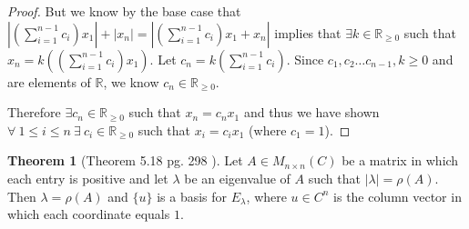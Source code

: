 \documentclass{amsart}
\theoremstyle{definition}
\newtheorem{theorem}{Theorem}
\theoremstyle{remark}
\numberwithin{equation}{section}
\begin{document}
\begin{proof}
But we know by the base case that 
$|(\sum_{i = 1}^{n-1}c_i )x_1| + |x_n| = |(\sum_{i = 1}^{n-1} c_i)x_1 + x_n|$
implies that $\exists k \in \mathbb{R}_{\geq 0}$ such that $x_n = k((\sum_{i = 1}^{n-1} c_i)x_1)$.
Let $c_n = k(\sum_{i = 1}^{n-1} c_i)$.
Since $c_1, c_2 \ldots c_{n-1}, k \geq 0$ and are elements of $\mathbb{R}$, we know $c_n \in \mathbb{R}_{\geq 0}$.

Therefore $\exists c_n \in \mathbb{R}_{\geq 0}$ such that $x_n = c_n x_1$ and thus we have shown $\forall\ 1 \leq i \leq n\ \exists\ c_i \in \mathbb{R}_{\geq 0}$ such that $x_i = c_ix_1$ (where $c_1 = 1$).


\end{proof}

\newpage 

\begin{theorem}[Theorem 5.18 pg. 298 \cite{friedberg2003linear}]\label{theorem518}
Let $A \in M_{n \times n} (C)$ be a matrix in which each entry is positive and let $\lambda$ be an eigenvalue of $A$ such that $| \lambda | = \rho(A)$.
Then $\lambda = \rho(A)$ and $\{ u \}$ is a basis for $E_{\lambda}$, where $u \in C^n$ is the column vector in which each coordinate equals $1$.

\end{theorem}
\end{document}
